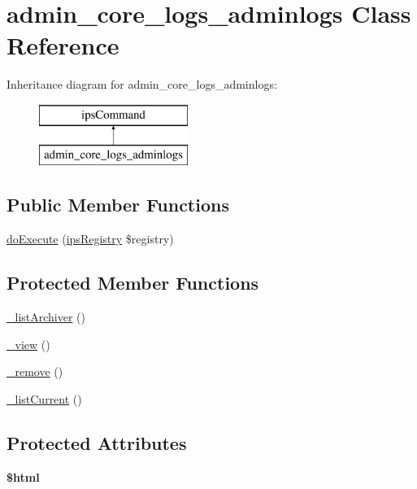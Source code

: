 \hypertarget{classadmin__core__logs__adminlogs}{\section{admin\-\_\-core\-\_\-logs\-\_\-adminlogs Class Reference}
\label{classadmin__core__logs__adminlogs}
}
Inheritance diagram for admin\-\_\-core\-\_\-logs\-\_\-adminlogs\-:\begin{figure}[H]
\begin{center}
\leavevmode
\includegraphics[height=2.000000cm]{classadmin__core__logs__adminlogs}
\end{center}
\end{figure}
\subsection*{Public Member Functions}
\begin{DoxyCompactItemize}
\item 
\hyperlink{classadmin__core__logs__adminlogs_afbc4e912a0604b94d47d66744c64d8ba}{do\-Execute} (\hyperlink{classips_registry}{ips\-Registry} \$registry)
\end{DoxyCompactItemize}
\subsection*{Protected Member Functions}
\begin{DoxyCompactItemize}
\item 
\hyperlink{classadmin__core__logs__adminlogs_ac90746b751555d7c9feb7bfde06fb140}{\-\_\-list\-Archiver} ()
\item 
\hyperlink{classadmin__core__logs__adminlogs_aecb3513e402840411fb3737f4f2d3193}{\-\_\-view} ()
\item 
\hyperlink{classadmin__core__logs__adminlogs_a6e3a0c448dcfd8610c6ddf42c6c660aa}{\-\_\-remove} ()
\item 
\hyperlink{classadmin__core__logs__adminlogs_abc03e9ca0857dea04554a012ac374f5a}{\-\_\-list\-Current} ()
\end{DoxyCompactItemize}
\subsection*{Protected Attributes}
\begin{DoxyCompactItemize}
\item 
\hypertarget{classadmin__core__logs__adminlogs_a6f96e7fc92441776c9d1cd3386663b40}{{\bfseries \$html}}\label{classadmin__core__logs__adminlogs_a6f96e7fc92441776c9d1cd3386663b40}

\end{DoxyCompactItemize}

